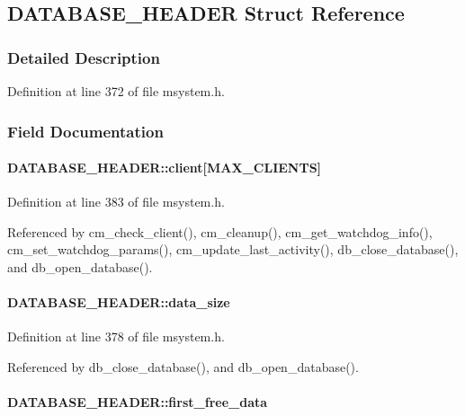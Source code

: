 \subsection{DATABASE\_\-HEADER Struct Reference}
\label{structDATABASE__HEADER}


\subsubsection{Detailed Description}


Definition at line 372 of file msystem.h.

\subsubsection{Field Documentation}
\paragraph[{client}]{ {\bf DATABASE\_\-HEADER::client}\mbox{[}MAX\_\-CLIENTS\mbox{]}}\hfill\label{structDATABASE__HEADER_a9a8a0ae17825f2dac69e1cd0d52bab74}


Definition at line 383 of file msystem.h.

Referenced by cm\_\-check\_\-client(), cm\_\-cleanup(), cm\_\-get\_\-watchdog\_\-info(), cm\_\-set\_\-watchdog\_\-params(), cm\_\-update\_\-last\_\-activity(), db\_\-close\_\-database(), and db\_\-open\_\-database().
\paragraph[{data\_\-size}]{ {\bf DATABASE\_\-HEADER::data\_\-size}}\hfill\label{structDATABASE__HEADER_a87014dcdb0ab9ae7f664f435a8a25058}


Definition at line 378 of file msystem.h.

Referenced by db\_\-close\_\-database(), and db\_\-open\_\-database().
\paragraph[{first\_\-free\_\-data}]{ {\bf DATABASE\_\-HEADER::first\_\-free\_\-data}}\hfill\label{structDATABASE__HEADER_ab00d6d5f8cfa692d6b128f7c123553ac}


